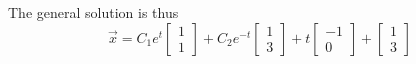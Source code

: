 \begin{enumerate}[label=\arabic*.]
\begin{equation*}
			\end{equation*}
			The general solution is thus
			\begin{equation*}
				\vec{x} = C_1e^{t}\begin{bmatrix}
					1 \\
					1
				\end{bmatrix} + C_2e^{-t}\begin{bmatrix}
					1 \\
					3
				\end{bmatrix} + t\begin{bmatrix}
					-1 \\
					0
				\end{bmatrix} + \begin{bmatrix}
					1 \\
					3
				\end{bmatrix} 
			\end{equation*}
\end{enumerate}